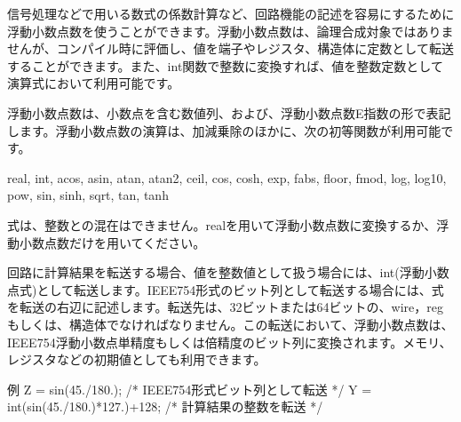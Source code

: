 信号処理などで用いる数式の係数計算など、回路機能の記述を容易にするために浮動小数点数を使うことができます。浮動小数点数は、論理合成対象ではありませんが、コンパイル時に評価し、値を端子やレジスタ、構造体に定数として転送することができます。また、\textunderscore{}int関数で整数に変換すれば、値を整数定数として演算式において利用可能です。

浮動小数点数は、小数点を含む数値列、および、浮動小数点数E指数の形で表記します。浮動小数点数の演算は、加減乗除のほかに、次の初等関数が利用可能です。

\textunderscore{}real, \textunderscore{}int, \textunderscore{}acos, \textunderscore{}asin, \textunderscore{}atan, \textunderscore{}atan2, \textunderscore{}ceil, \textunderscore{}cos, \textunderscore{}cosh, \textunderscore{}exp, \textunderscore{}fabs,
\textunderscore{}floor, \textunderscore{}fmod, \textunderscore{}log, \textunderscore{}log10, \textunderscore{}pow, \textunderscore{}sin, \textunderscore{}sinh, \textunderscore{}sqrt, \textunderscore{}tan, \textunderscore{}tanh

式は、整数との混在はできません。\textunderscore{}realを用いて浮動小数点数に変換するか、浮動小数点数だけを用いてください。

回路に計算結果を転送する場合、値を整数値として扱う場合には、\textunderscore{}int(浮動小数点式)として転送します。IEEE754形式のビット列として転送する場合には、式を転送の右辺に記述します。転送先は、32ビットまたは64ビットの、wire，regもしくは、構造体でなければなりません。この転送において、浮動小数点数は、IEEE754浮動小数点単精度もしくは倍精度のビット列に変換されます。メモリ、レジスタなどの初期値としても利用できます。

例  Z = \textunderscore{}sin(45./180.);    /* IEEE754形式ビット列として転送 */
Y = \textunderscore{}int(\textunderscore{}sin(45./180.)*127.)+128; /* 計算結果の整数を転送 */
